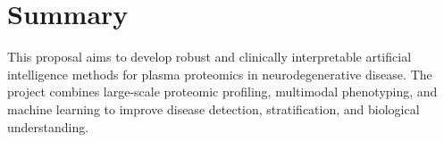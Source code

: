 \section{Summary}

This proposal aims to develop robust and clinically interpretable
artificial intelligence methods for plasma proteomics in
neurodegenerative disease.\citep{roberts2019validation}
The project combines large-scale proteomic profiling, multimodal
phenotyping, and machine learning to improve disease detection,
stratification, and biological understanding.
